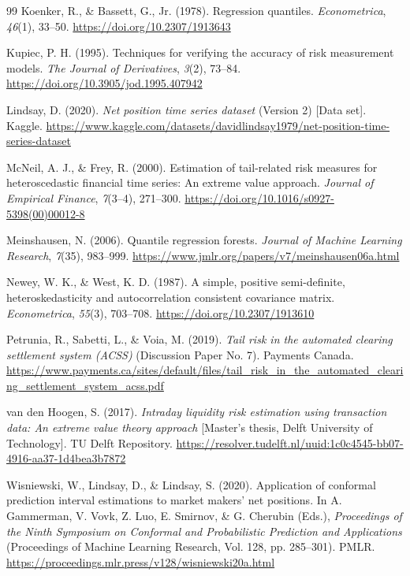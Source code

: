 \documentclass[11pt,a4paper]{article}
\begin{document}
\begin{thebibliography}{99}
 Koenker, R., \& Bassett, G., Jr. (1978). Regression quantiles. \emph{Econometrica}, \emph{46}(1), 33--50. \url{https://doi.org/10.2307/1913643}

 Kupiec, P. H. (1995). Techniques for verifying the accuracy of risk measurement models. \emph{The Journal of Derivatives}, \emph{3}(2), 73--84. \url{https://doi.org/10.3905/jod.1995.407942}

 Lindsay, D. (2020). \emph{Net position time series dataset} (Version 2) [Data set]. Kaggle. \url{https://www.kaggle.com/datasets/davidlindsay1979/net-position-time-series-dataset}

 McNeil, A. J., \& Frey, R. (2000). Estimation of tail-related risk measures for heteroscedastic financial time series: An extreme value approach. \emph{Journal of Empirical Finance}, \emph{7}(3--4), 271--300. \url{https://doi.org/10.1016/s0927-5398(00)00012-8}

 Meinshausen, N. (2006). Quantile regression forests. \emph{Journal of Machine Learning Research}, \emph{7}(35), 983--999. \url{https://www.jmlr.org/papers/v7/meinshausen06a.html}

 Newey, W. K., \& West, K. D. (1987). A simple, positive semi-definite, heteroskedasticity and autocorrelation consistent covariance matrix. \emph{Econometrica}, \emph{55}(3), 703--708. \url{https://doi.org/10.2307/1913610}

 Petrunia, R., Sabetti, L., \& Voia, M. (2019). \emph{Tail risk in the automated clearing settlement system (ACSS)} (Discussion Paper No. 7). Payments Canada. \url{https://www.payments.ca/sites/default/files/tail_risk_in_the_automated_clearing_settlement_system_acss.pdf}

 van den Hoogen, S. (2017). \emph{Intraday liquidity risk estimation using transaction data: An extreme value theory approach} [Master's thesis, Delft University of Technology]. TU Delft Repository. \url{https://resolver.tudelft.nl/uuid:1c0c4545-bb07-4916-aa37-1d4bea3b7872}

 Wisniewski, W., Lindsay, D., \& Lindsay, S. (2020). Application of conformal prediction interval estimations to market makers' net positions. In A. Gammerman, V. Vovk, Z. Luo, E. Smirnov, \& G. Cherubin (Eds.), \emph{Proceedings of the Ninth Symposium on Conformal and Probabilistic Prediction and Applications} (Proceedings of Machine Learning Research, Vol. 128, pp. 285--301). PMLR. \url{https://proceedings.mlr.press/v128/wisniewski20a.html}


\end{thebibliography}
\end{document}
